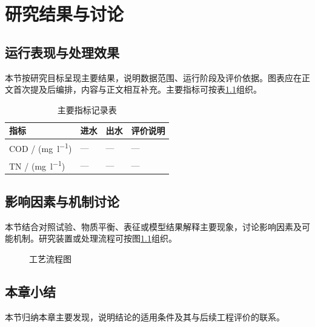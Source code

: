 \chapter{研究结果与讨论}
\section{运行表现与处理效果}
本节按研究目标呈现主要结果，说明数据范围、运行阶段及评价依据。图表应在正文首次提及后编排，内容与正文相互补充。主要指标可按表\ref{tab:results}组织。
\begin{table}[htbp]
\caption{主要指标记录表}\label{tab:results}
\centering\tjsmall
\begin{tabularx}{\textwidth}{@{}lXXX@{}}
\toprule
指标 & 进水 & 出水 & 评价说明\\\midrule
COD / (\unit{\milli\gram\per\litre}) & — & — & —\\
TN / (\unit{\milli\gram\per\litre}) & — & — & —\\
\bottomrule
\end{tabularx}
\end{table}
\section{影响因素与机制讨论}
本节结合对照试验、物质平衡、表征或模型结果解释主要现象，讨论影响因素及可能机制。研究装置或处理流程可按图\ref{fig:route}组织。
\begin{figure}[htbp]
\centering
\caption{工艺流程图}\label{fig:route}
\end{figure}
\section{本章小结}
本节归纳本章主要发现，说明结论的适用条件及其与后续工程评价的联系。
